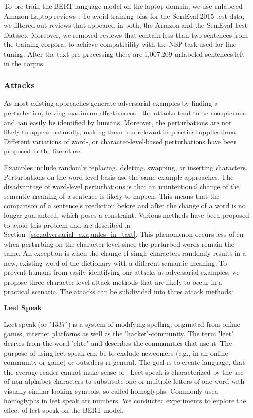 To pre-train the BERT language model on the laptop domain, we use unlabeled Amazon Laptop reviews \cite{he2016ups}. To avoid training bias for the SemEval-2015 test data, we filtered out reviews that appeared in both, the Amazon and the SemEval Test Dataset. Moreover, we removed reviews that contain less than two sentences from the training corpora, to achieve compatibility with the NSP task used for fine tuning. After the text pre-processing there are 1,007,209 unlabeled sentences left in the corpus. 


\subsubsection{Attacks}
\label{sec:attacks_method}
As most existing approaches generate adversarial examples by finding a perturbation, having maximum effectiveness \cite{liang2017deep, ebrahimi2017hotflip, gao2018black, li2018textbugger, alzantot2018generating, jin2019bert, garg2020bae}, the attacks tend to be conspicuous and can easily be identified by humans. Moreover, the perturbations are not likely to appear naturally, making them less relevant in practical applications. Different variations of word-, or character-level-based perturbations have been proposed in the literature. 

Examples include randomly replacing, deleting, swapping, or inserting characters. Perturbations on the word level basis use the same example approaches.  
The disadvantage of word-level perturbations is that an unintentional change of the semantic meaning of a sentence is likely to happen. This means that the comparison of a sentence's prediction before and after the change of a word is no longer guaranteed, which poses a constraint. Various methods have been proposed to avoid this problem and are described in Section~\ref{sec:adversarial_exapmles_in_text}. 
This phenomenon occurs less often when perturbing on the character level since the perturbed words remain the same. An exception is when the change of single characters randomly results in a new, existing word of the dictionary with a different semantic meaning. 
To prevent humans from easily identifying our attacks as adversarial examples, we propose three character-level attack methods that are likely to occur in a practical scenario. The attacks can be subdivided into three attack methods:


\textbf{Leet Speak}

Leet speak (or "1337") is a system of modifying spelling, originated from online games, internet platforms as well as the "hacker"-community. The term "leet" derives from the word "elite" and describes the communities that use it. The purpose of using leet speak can be to exclude newcomers (e.g., in an online community or game) or outsiders in general. The goal is to create language, that the average reader cannot make sense of \cite{thomas2002hacker}.
Leet speak is characterized by the use of non-alphabet characters to substitute one or multiple letters of one word with visually similar-looking symbols, so-called homoglyphs. Commonly used homoglyphs in leet speak are numbers. 
We conducted experiments to explore the effect of leet speak on the BERT model. 


